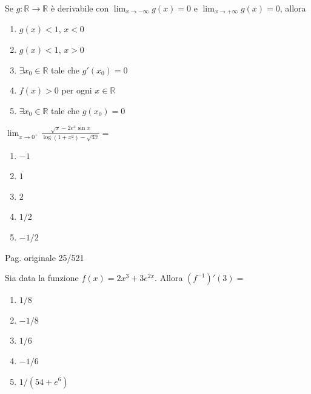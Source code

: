 \begin{quiz}
Se $g:\mathbb R\to\mathbb R$ \`e derivabile con $\lim_{x\to-\infty}g(x)=0$ e $\lim_{x\to+\infty}g(x)=0$, allora
\begin{enumerate}[label=\alph*),leftmargin=1.3cm,itemsep=3pt,topsep=5pt]
\item $g(x)<1$, $x<0$
\item $g(x)<1$, $x>0$
\item $\exists x_0\in\mathbb R$ tale che $g\prime(x_0)=0$
\item $f(x)>0$ per ogni $x\in\mathbb R$
\item $\exists x_0\in\mathbb R$ tale che $g(x_0)=0$
\end{enumerate}
\end{quiz}

\begin{quiz}
$\displaystyle\lim_{x\to0^+}\frac{\sqrt{x}-2e^x\sin x}{\log(1+x^2)-\sqrt{4x}}=$
\begin{enumerate}[label=\alph*),leftmargin=1.3cm,itemsep=3pt,topsep=5pt]
\item $-1$
\item $1$
\item $2$
\item $1/2$
\item $-1/2$
\end{enumerate}
\end{quiz}

\par\noindent\hfill{\color{cyan!65!black}\scriptsize Pag. originale 25/521}\par\smallskip

\begin{quiz}
Sia data la funzione $f(x)=2x^3+3e^{2x}$. Allora $(f^{-1})\prime(3)=$
\begin{enumerate}[label=\alph*),leftmargin=1.3cm,itemsep=3pt,topsep=5pt]
\item $1/8$
\item $-1/8$
\item $1/6$
\item $-1/6$
\item $1/(54+e^6)$
\end{enumerate}
\end{quiz}

